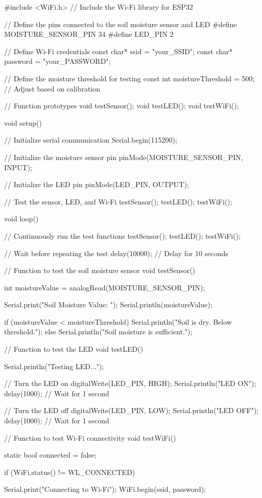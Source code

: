 \begin{Arduino}
	#include <WiFi.h>  // Include the Wi-Fi library for ESP32
	
	// Define the pins connected to the soil moisture sensor and LED
	#define MOISTURE_SENSOR_PIN 34
	#define LED_PIN 2
	
	// Define Wi-Fi credentials
	const char* ssid = "your_SSID";
	const char* password = "your_PASSWORD";
	
	// Define the moisture threshold for testing
	const int moistureThreshold = 500; // Adjust based on calibration
	
	// Function prototypes
	void testSensor();
	void testLED();
	void testWiFi();
	
	void setup() {
		// Initialize serial communication
		Serial.begin(115200);
		
		// Initialize the moisture sensor pin
		pinMode(MOISTURE_SENSOR_PIN, INPUT);
		
		// Initialize the LED pin
		pinMode(LED_PIN, OUTPUT);
		
		// Test the sensor, LED, and Wi-Fi
		testSensor();
		testLED();
		testWiFi();
	}
	
	void loop() {
		// Continuously run the test functions
		testSensor();
		testLED();
		testWiFi();
		
		// Wait before repeating the test
		delay(10000); // Delay for 10 seconds
	}
	
	// Function to test the soil moisture sensor
	void testSensor() {
		int moistureValue = analogRead(MOISTURE_SENSOR_PIN);
		
		Serial.print("Soil Moisture Value: ");
		Serial.println(moistureValue);
		
		if (moistureValue < moistureThreshold) {
			Serial.println("Soil is dry. Below threshold.");
		} else {
			Serial.println("Soil moisture is sufficient.");
		}
	}
	
	// Function to test the LED
	void testLED() {
		Serial.println("Testing LED...");
		
		// Turn the LED on
		digitalWrite(LED_PIN, HIGH);
		Serial.println("LED ON");
		delay(1000); // Wait for 1 second
		
		// Turn the LED off
		digitalWrite(LED_PIN, LOW);
		Serial.println("LED OFF");
		delay(1000); // Wait for 1 second
	}
	
	// Function to test Wi-Fi connectivity
	void testWiFi() {
		static bool connected = false;
		
		if (WiFi.status() != WL_CONNECTED) {
			Serial.print("Connecting to Wi-Fi");
			WiFi.begin(ssid, password);
			
}}
\end{Arduino}
